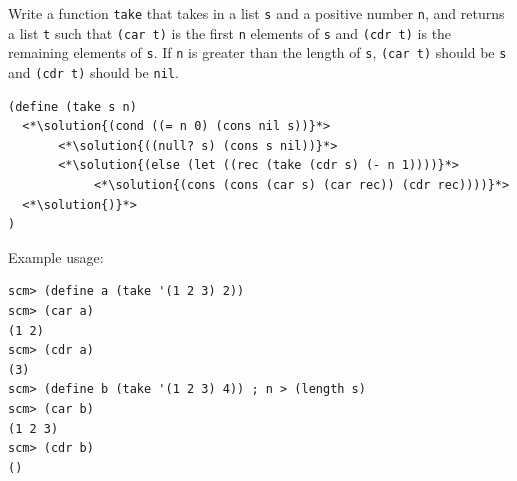\documentclass[twoside]{article}
\newcommand{\solution}[1]{{\color{red}#1}}
\newcommand\solution[1]{} %
\begin{document}
\begin{enumerate}

Write a function \lstinline{take} that takes in a list \lstinline{s} and a positive number \lstinline{n}, and
returns a list \lstinline{t} such that \lstinline{(car t)} is the first \lstinline{n} elements of \lstinline{s} and \lstinline{(cdr t)}
is the remaining elements of \lstinline{s}. If \lstinline{n} is greater than the length of \lstinline{s}, \lstinline{(car t)} should be \lstinline{s} and \lstinline{(cdr t)} should be \lstinline{nil}.

\begin{lstlisting}
(define (take s n)
  <*\solution{(cond ((= n 0) (cons nil s))}*>
       <*\solution{((null? s) (cons s nil))}*>
       <*\solution{(else (let ((rec (take (cdr s) (- n 1))))}*>
            <*\solution{(cons (cons (car s) (car rec)) (cdr rec))))}*>
  <*\solution{)}*>
)
\end{lstlisting}

Example usage:

\begin{lstlisting}
scm> (define a (take '(1 2 3) 2))
scm> (car a)
(1 2)
scm> (cdr a)
(3)
scm> (define b (take '(1 2 3) 4)) ; n > (length s)
scm> (car b)
(1 2 3)
scm> (cdr b)
()
\end{lstlisting}

\end{enumerate}
\end{document}
